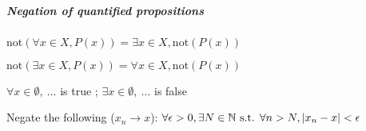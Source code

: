 \subparagraph{Negation of quantified propositions}
\begin{property}
	$\mathrm{not}(\forall x\in X, P(x)) = \exists x\in X, \mathrm{not}(P(x))$
\end{property}
\begin{property}
	$\mathrm{not}(\exists x\in X, P(x)) = \forall x\in X, \mathrm{not}(P(x))$
\end{property}
\begin{notation}
	$\forall x \in \emptyset, \ \dots$ is true ;
	$\exists x \in \emptyset, \ \dots$ is false
\end{notation}
\begin{question}
	Negate the following ($x_n \to x$):
	$\forall \epsilon>0, \exists N \in \mathbb{N} \text{ s.t. } \forall n>N, | x_n-x |<\epsilon$
\end{question}

